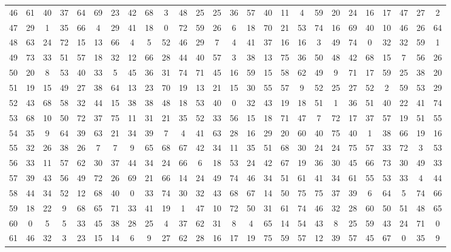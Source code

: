 \begin{table}
\begin{tabular}{c c c c c c c c c c c c c c c c c c c c c c c c c c }
46 & 61 & 40 & 37 & 64 & 69 & 23 & 42 & 68 & 3 & 48 & 25 & 25 & 36 & 57 & 40 & 11 & 4 & 59 & 20 & 24 & 16 & 17 & 47 & 27 & 2 \\
47 & 29 & 1 & 35 & 66 & 4 & 29 & 41 & 18 & 0 & 72 & 59 & 26 & 6 & 18 & 70 & 21 & 53 & 74 & 16 & 69 & 40 & 10 & 46 & 26 & 64 \\
48 & 63 & 24 & 72 & 15 & 13 & 66 & 4 & 5 & 52 & 46 & 29 & 7 & 4 & 41 & 37 & 16 & 16 & 3 & 49 & 74 & 0 & 32 & 32 & 59 & 1 \\
49 & 73 & 33 & 51 & 57 & 18 & 32 & 12 & 66 & 28 & 44 & 40 & 57 & 3 & 38 & 13 & 75 & 36 & 50 & 48 & 42 & 68 & 15 & 7 & 56 & 26 \\
50 & 20 & 8 & 53 & 40 & 33 & 5 & 45 & 36 & 31 & 74 & 71 & 45 & 16 & 59 & 15 & 58 & 62 & 49 & 9 & 71 & 17 & 59 & 25 & 38 & 20 \\
51 & 19 & 15 & 49 & 27 & 38 & 64 & 13 & 23 & 70 & 19 & 13 & 21 & 15 & 30 & 55 & 57 & 9 & 52 & 25 & 27 & 52 & 2 & 59 & 53 & 29 \\
52 & 43 & 68 & 58 & 32 & 44 & 15 & 38 & 38 & 48 & 18 & 53 & 40 & 0 & 32 & 43 & 19 & 18 & 51 & 1 & 36 & 51 & 40 & 22 & 41 & 74 \\
53 & 68 & 10 & 50 & 72 & 37 & 75 & 11 & 31 & 21 & 35 & 52 & 33 & 56 & 15 & 18 & 71 & 47 & 7 & 72 & 17 & 37 & 57 & 19 & 51 & 55 \\
54 & 35 & 9 & 64 & 39 & 63 & 21 & 34 & 39 & 7 & 4 & 41 & 63 & 28 & 16 & 29 & 20 & 60 & 40 & 75 & 40 & 1 & 38 & 66 & 19 & 16 \\
55 & 32 & 26 & 38 & 26 & 7 & 7 & 9 & 65 & 68 & 67 & 42 & 34 & 11 & 35 & 51 & 68 & 30 & 24 & 24 & 75 & 57 & 33 & 72 & 3 & 53 \\
56 & 33 & 11 & 57 & 62 & 30 & 37 & 44 & 34 & 24 & 66 & 6 & 18 & 53 & 24 & 42 & 67 & 19 & 36 & 30 & 45 & 66 & 73 & 30 & 49 & 33 \\
57 & 39 & 43 & 56 & 49 & 72 & 26 & 69 & 21 & 66 & 14 & 24 & 49 & 74 & 46 & 34 & 51 & 61 & 41 & 34 & 61 & 55 & 53 & 33 & 4 & 44 \\
58 & 44 & 34 & 52 & 12 & 68 & 40 & 0 & 33 & 74 & 30 & 32 & 43 & 68 & 67 & 14 & 50 & 75 & 75 & 37 & 39 & 6 & 64 & 5 & 74 & 66 \\
59 & 18 & 22 & 9 & 68 & 65 & 71 & 33 & 41 & 19 & 1 & 47 & 10 & 72 & 50 & 31 & 61 & 74 & 46 & 32 & 28 & 60 & 50 & 51 & 48 & 65 \\
60 & 0 & 5 & 5 & 33 & 45 & 38 & 28 & 25 & 4 & 37 & 62 & 31 & 8 & 4 & 65 & 14 & 54 & 43 & 8 & 25 & 59 & 43 & 24 & 71 & 0 \\
61 & 46 & 32 & 3 & 23 & 15 & 14 & 6 & 9 & 27 & 62 & 28 & 16 & 17 & 19 & 75 & 59 & 57 & 12 & 39 & 57 & 45 & 67 & 0 & 35 & 9 \\

\end{tabular}
\end{table}
